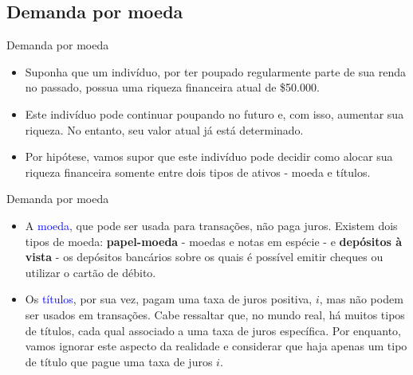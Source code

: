 \documentclass[10pt]{beamer}
\begin{document}
\subsection{Demanda por moeda}
\begin{frame}{Demanda por moeda}
    \begin{itemize}
        \item Suponha que um indivíduo, por ter poupado regularmente parte de sua renda no passado, possua uma riqueza financeira atual de \$50.000.
        \bigskip
        \item Este indivíduo pode continuar poupando no futuro e, com isso, aumentar sua riqueza. No entanto, seu valor atual já está determinado.
        \bigskip
        \item Por hipótese, vamos supor que este indivíduo pode decidir como alocar sua riqueza financeira somente entre dois tipos de ativos - moeda e títulos.
    \end{itemize}
\end{frame}

\begin{frame}{Demanda por moeda}
    \begin{itemize}
        \item A \textcolor{blue}{moeda}, que pode ser usada para transações, não paga juros. Existem dois tipos de moeda: \textbf{papel-moeda} - moedas e notas em espécie - e \textbf{depósitos à vista} - os depósitos bancários sobre os quais é possível emitir cheques ou utilizar o cartão de débito.
        \bigskip
        \item Os \textcolor{blue}{títulos}, por sua vez, pagam uma taxa de juros positiva, $i$, mas não podem ser usados em transações. Cabe ressaltar que, no mundo real, há muitos tipos de títulos, cada qual associado a uma taxa de juros específica. Por enquanto, vamos ignorar este aspecto da realidade e considerar que haja apenas um tipo de título que pague uma taxa de juros $i$.
    \end{itemize}
\end{frame}
\end{document}
